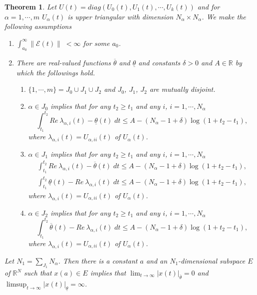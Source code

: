 \documentclass[a4paper,11pt]{article}
\newcommand{\upl}{\overline{\lambda}}
\newcommand{\udl}{\underline{\lambda}}
\newcommand{\tl}{{\underline{\theta}}}
\newcommand{\tu}{{\overline{\theta}}}
\newcommand{\E}{\mathcal{E}}
\newcounter{Theorem}
\newtheorem{theorem}[Theorem]{Theorem}
\theoremstyle{remark}
\begin{document}
%
\begin{theorem} \label{thm:3} Let $U(t)=diag(U_0(t),U_1(t),\cdots,U_k(t))$ and for $\alpha=1,\cdots,m$ $U_\alpha(t)$ is upper triangular with dimension $N_\alpha\times N_\alpha$. We make the following assumptions%
\begin{enumerate}
\item $\int_{a_0}^\infty \|\E(t)\| \; < \infty$ for some $a_0$.
\item There are real-valued functions $\tu$ and $\tl$ and constants $\delta >0$ and $A\in \mathbb{R}$ by which the followings hold.
\begin{enumerate}
\item $\{1,\cdots,m\}=J_0 \cup J_1 \cup J_2$ and $J_0$, $J_1$, $J_2$ are mutually disjoint. %
\item $\alpha \in J_0$ implies that for any $t_2\ge t_1$ and any $i$, $i=1,\cdots,N_\alpha$ 
$$ \int_{t_1}^{t_2} Re\: \lambda_{\alpha,i}(t) - \tl(t) \; dt \le A -(N_\alpha -1 +\delta)\log(1+t_2-t_1),$$
where $\lambda_{\alpha,i}(t) = U_{\alpha,ii}(t)$ of $U_\alpha(t)$.
\item $\alpha \in J_1$ implies that for any $t_2\ge t_1$ and any $i$, $i=1,\cdots,N_\alpha$ 
\begin{align*}
\int_{t_1}^{t_2} Re\: \lambda_{\alpha,i}(t) - \tu(t) \; dt \le A -(N_\alpha -1 +\delta)\log(1+t_2-t_1),\\
\int_{t_1}^{t_2} \tl(t)- Re\: \lambda_{\alpha,i}(t) \; dt \le A -(N_\alpha -1 +\delta)\log(1+t_2-t_1),
\end{align*}
where $\lambda_{\alpha,i}(t) = U_{\alpha,ii}(t)$ of $U_\alpha(t)$.
\item $\alpha \in J_2$ implies that for any $t_2\ge t_1$ and any $i$, $i=1,\cdots,N_\alpha$
$$ \int_{t_1}^{t_2} \tu(t)- Re\: \lambda_{\alpha,i}(t) \; dt \le A -(N_\alpha -1 +\delta)\log(1+t_2-t_1),$$
where $\lambda_{\alpha,i}(t) = U_{\alpha,ii}(t)$ of $U_\alpha(t)$.
\end{enumerate}
\end{enumerate}
Let $\displaystyle N_1 = \sum_{J_1} N_\alpha$. Then there is a constant $a$ and an $N_1$-dimensional subspace $E$ of $\mathbb{R}^N$ such that $x(a) \in E$ implies that $\displaystyle \lim_{t \rightarrow \infty} |x(t)|_\tu =0$ and $\displaystyle \limsup_{t \rightarrow \infty}|x(t)|_\tl = \infty$.
\end{theorem}
\end{document}
